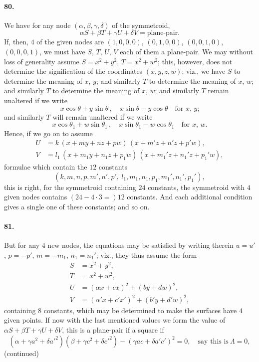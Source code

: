 \documentclass[11pt,a4paper]{article}
\begin{document}
\bigskip

\paragraph{80.}
We have for any node $(\alpha, \beta, \gamma, \delta)$ of the symmetroid,
\[
\alpha S + \beta T + \gamma U + \delta V = \text{plane-pair}.
\]
If, then, $4$ of the given nodes are $(1, 0, 0, 0)$, $(0, 1, 0, 0)$, $(0, 0, 1, 0)$,
$(0, 0, 0, 1)$, we must have $S$, $T$, $U$, $V$ each of them a plane-pair. We may
without loss of generality assume $S = x^2 + y^2$, $T = x^2 + w^2$; this, however,
does not determine the signification of the coordinates $(x, y, z, w)$; viz., we
have $S$ to determine the meaning of $x$, $y$; and similarly $T$ to determine the
meaning of $x$, $w$; and similarly $T$ to determine the meaning of $x$, $w$; and
similarly $T$ remain unaltered if we write
\[
x \cos\theta + y \sin\theta\,,\quad x \sin\theta - y \cos\theta\quad\text{for $x$, $y$;}
\]
and similarly $T$ will remain unaltered if we write
\[
x \cos\theta_1 + w \sin\theta_1\,,\quad x \sin\theta_1 - w \cos\theta_1\quad\text{for $x$, $w$.}
\]
Hence, if we go on to assume
\begin{align*}
U &= k\,(x + my + nz + pw)\,(x + m'z + n'z + p'w),\\
V &= l_1\,(x + m_1y + n_1z + p_1w)\,(x + m_1'z + n_1'z + p_1'w),
\end{align*}
formulae which contain the $12$ constants
\[
(k, m, n, p, m', n', p',\ l_1, m_1, n_1, p_1, m_1', n_1', p_1'),
\]
this is right, for the symmetroid containing $24$ constants, the symmetroid with $4$
given nodes contains $(24 - 4 \cdot 3 =) 12$ constants. And each additional condition
gives a single one of these constants; and so on.

\medskip

\paragraph{81.}
But for any $4$ new nodes, the equations may be satisfied by writing therein
$u = u'$, $p = -p'$, $m = -m_1$, $n_1 = n_1'$; viz., they thus assume the form
\begin{align*}
S &= x^2 + y^2,\\
T &= x^2 + w^2,\\
U &= (\alpha x + c x)^2 + (b y + d w)^2,\\
V &= (\alpha' x + c' x')^2 + (b' y + d' w)^2,
\end{align*}
containing $8$ constants, which may be determined to make the surfaces have $4$ given
points. If now with the last mentioned values we form the value of
$\alpha S + \beta T + \gamma U + \delta V$, this is a plane-pair if a square if
\[
(\alpha + \gamma a^2 + \delta a'^2)(\beta + \gamma c^2 + \delta c'^2)
- (\gamma a c + \delta a' c')^2 = 0,\quad \text{say this is}\ \Lambda = 0,
\]
\hfill (continued)
\end{document}
